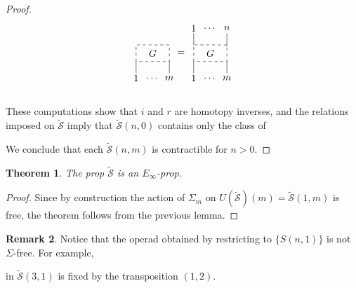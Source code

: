 \documentclass{amsart}
\renewcommand{\S}{\mathcal{S}}
\renewcommand{\1}{\mathbf{1}}
\newtheorem{theorem}{Theorem}
\theoremstyle{definition}
\newtheorem{remark}[theorem]{Remark}
\begin{document}
\begin{proof}
\begin{equation*}
{\begin{tikzpicture}[scale=.6]
		\draw [dashed] (0,0) rectangle (2,1); \node at (1, .5) {$G$};
		
		\node at (0,-1) {$1$}; \draw (0,-.7) -- (0,0);
		\node at (1,-1) {$\dots$};
		\node at (2,-1) {$m$}; \draw (2,-.7) -- (2,0);
		\node at (2.7,.5) {$=$}; 
		\end{tikzpicture}
		\begin{tikzpicture}[scale=.6]
		\node at (0,2) {$1$}; \draw (0,1.7) -- (0,1);
		\node at (1,2) {$\dots$};
		\node at (2,2) {$n$}; \draw (2,1.7) -- (2,.9);
		
		\draw [dashed] (0,0) rectangle (2,1); \node at (1, .5) {$G$};
		
		\node at (0,-1) {$1$}; \draw (0,-.7) -- (0,0);
		\node at (1,-1) {$\dots$};
		\node at (2,-1) {$m$}; \draw (2,-.7) -- (2,0);
		\end{tikzpicture}
	}\end{equation*}\\
	These computations show that $i$ and $r$ are homotopy inverses, and the relations imposed on $\tilde{\S}$ imply that $\tilde{\S}(n,0)$ contains only the class of \vspace*{-7pt}
	\begin{center}
	\end{center}\vspace*{-7pt}
	We conclude that each $\tilde{\S}(n,m)$ is contractible for $n > 0$.
\end{proof}

\begin{theorem} \label{sigma-free resolution}
	The prop $\tilde{\S}$ is an $E_\infty$-prop.
\end{theorem}

\begin{proof}
	Since by construction the action of $\Sigma_m$ on $U(\tilde{\S})(m)=\tilde{\S}(1,m)$ is free, the theorem follows from the previous lemma.
\end{proof}

\begin{remark}
	Notice that the operad obtained by restricting to $\{S(n,1)\}$ is not $\Sigma$-free. For example, 
	\begin{center}
	\end{center}
	in $\tilde{\S}(3,1)$ is fixed by the transposition $(1,2)$.
\end{remark}
\end{document}
